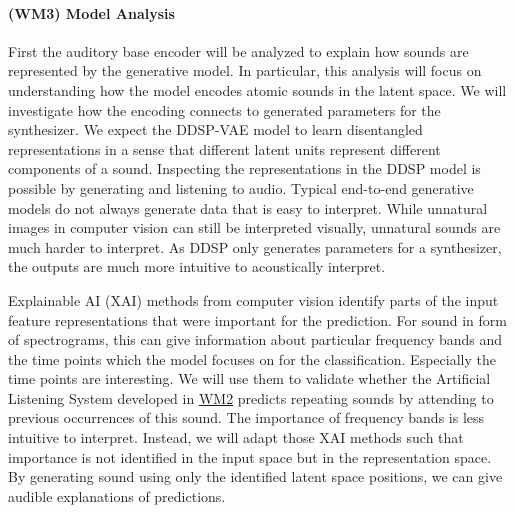 \documentclass[11pt]{article}
\newcommand{\wpdef}[2]{\hypertarget{sec:W#1}{\paragraph*{(W#1) #2}\label{sec:W#1}}}
\newcommand{\wpref}[2]{\hyperlink{sec:W#1}{#2}}
\begin{document}

\wpdef{M3}{Model Analysis}%


%
First the auditory base encoder will be analyzed to explain how sounds are represented by the generative model.
In particular, this analysis will focus on understanding how the model encodes atomic sounds in the latent space.
We will investigate how the encoding connects to generated parameters for the synthesizer.
We expect the DDSP-VAE model to learn disentangled representations in a sense that different latent units represent different components of a sound.
Inspecting the representations in the DDSP model is possible by generating and listening to audio.
Typical end-to-end generative models do not always generate data that is easy to interpret. 
While unnatural images in computer vision can still be interpreted visually, unnatural sounds are much harder to interpret.
As DDSP only generates parameters for a synthesizer, the outputs are much more intuitive to acoustically interpret.

Explainable AI (XAI) methods from computer vision identify parts of the input feature representations that were important for the prediction.
For sound in form of spectrograms, this can give information about particular frequency bands and the time points which the model focuses on for the classification.
Especially the time points are interesting. 
We will use them to validate whether the Artificial Listening System developed in \wpref{M2}{WM2} predicts repeating sounds by attending to previous occurrences of this sound.
The importance of frequency bands is less intuitive to interpret.
Instead, we will adapt those XAI methods such that importance is not identified in the input space but in the representation space.
By generating sound using only the identified latent space positions, we can give audible explanations of predictions.
\end{document}
